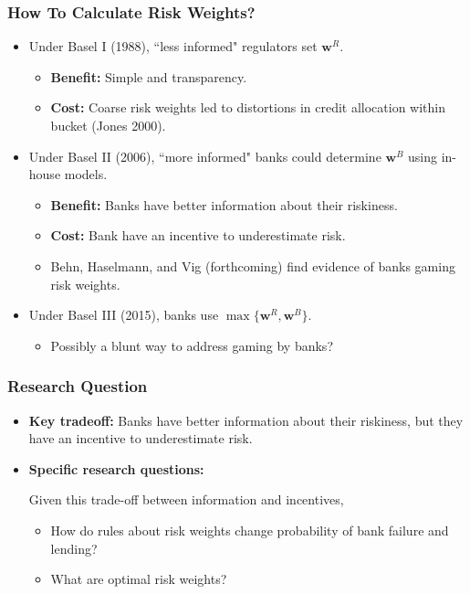 \documentclass{beamer}
\begin{document}
\begin{frame}[label=risk_weights]
\frametitle{How To Calculate Risk Weights?}
\begin{itemize}[<+->]
\item Under Basel I (1988), ``less informed" regulators set $\mathbf{w}^R$. \hyperlink{basel_i}{}
\begin{itemize}
\item \textbf{Benefit:} Simple and transparency. 
\item \textbf{Cost:} Coarse risk weights led to distortions in credit allocation within bucket (Jones 2000).
\end{itemize}
\bigskip
\item Under Basel II (2006), ``more informed" banks could determine $\mathbf{w}^B$ using in-house models. \hyperlink{basel_ii}{}
\begin{itemize}
\item \textbf{Benefit:} Banks have better information about their riskiness. 
\item \textbf{Cost:} Bank have an incentive to underestimate risk.
\item Behn, Haselmann, and Vig (forthcoming) find evidence of banks gaming risk weights. \hyperlink{bhv}{}
\end{itemize}
\bigskip
\item Under Basel III (2015), banks use $\max\{\mathbf{w}^R, \mathbf{w}^B\}$.
\begin{itemize}
\item Possibly a blunt way to address gaming by banks?
\end{itemize}
\end{itemize}
\end{frame}



\begin{frame}
\frametitle{Research Question}
\begin{itemize}[<+->]
\item \textbf{Key tradeoff:} Banks have better information about their riskiness, but they have an incentive to underestimate risk.
\bigskip
\item \textbf{Specific research questions:} 

\bigskip

Given this trade-off between information and incentives,

\bigskip

\begin{itemize}[<+->]
\item How do rules about risk weights change probability of bank failure and lending?
\bigskip
\item What are optimal risk weights?
\end{itemize}
\end{itemize}
\end{frame}
\end{document}
